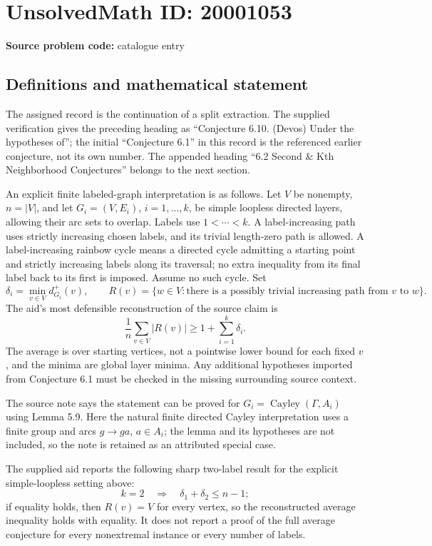 \documentclass[11pt]{article}
\begin{document}
\section*{UnsolvedMath ID: 20001053}
\textbf{Source problem code:} catalogue entry
\subsection{Definitions and mathematical statement}
The assigned record is the continuation of a split extraction. The supplied verification gives the preceding heading as ``Conjecture 6.10. (Devos) Under the hypotheses of''; the initial ``Conjecture 6.1'' in this record is the referenced earlier conjecture, not its own number. The appended heading ``6.2 Second \& Kth Neighborhood Conjectures'' belongs to the next section.

An explicit finite labeled-graph interpretation is as follows. Let \(V\) be nonempty, \(n=|V|\), and let \(G_i=(V,E_i)\), \(i=1,\ldots,k\), be simple loopless directed layers, allowing their arc sets to overlap. Labels use \(1<\cdots<k\). A label-increasing path uses strictly increasing chosen labels, and its trivial length-zero path is allowed. A label-increasing rainbow cycle means a directed cycle admitting a starting point and strictly increasing labels along its traversal; no extra inequality from its final label back to its first is imposed. Assume no such cycle. Set
\[
 \delta_i=\min_{v\in V}d_{G_i}^+(v),\qquad
 R(v)=\{w\in V:\text{there is a possibly trivial increasing path from }v\text{ to }w\}.
\]
The aid's most defensible reconstruction of the source claim is
\[
 \frac1n\sum_{v\in V}|R(v)|\ge1+\sum_{i=1}^k\delta_i.
\]
The average is over starting vertices, not a pointwise lower bound for each fixed \(v\), and the minima are global layer minima. Any additional hypotheses imported from Conjecture 6.1 must be checked in the missing surrounding source context.

The source note says the statement can be proved for \(G_i=\operatorname{Cayley}(\Gamma,A_i)\) using Lemma 5.9. Here the natural finite directed Cayley interpretation uses a finite group and arcs \(g\to ga\), \(a\in A_i\); the lemma and its hypotheses are not included, so the note is retained as an attributed special case.

The supplied aid reports the following sharp two-label result for the explicit simple-loopless setting above:
\[
 k=2\quad\Longrightarrow\quad\delta_1+\delta_2\le n-1;
\]
if equality holds, then \(R(v)=V\) for every vertex, so the reconstructed average inequality holds with equality. It does not report a proof of the full average conjecture for every nonextremal instance or every number of labels.
\end{document}
